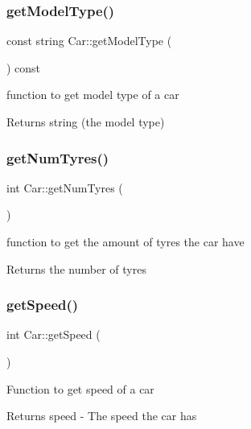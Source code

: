 \subsubsection{\texorpdfstring{get\+Model\+Type()}{getModelType()}}
{\footnotesize\ttfamily const string Car\+::get\+Model\+Type (\begin{DoxyParamCaption}{ }\end{DoxyParamCaption}) const\hspace{0.3cm}{\ttfamily [inline]}}

function to get model type of a car \begin{DoxyReturn}{Returns}
string (the model type) 
\end{DoxyReturn}
\mbox{\label{class_car_a37d6bc64d09b030dacd25de5f0fa0a64}} 
\subsubsection{\texorpdfstring{get\+Num\+Tyres()}{getNumTyres()}}
{\footnotesize\ttfamily int Car\+::get\+Num\+Tyres (\begin{DoxyParamCaption}{ }\end{DoxyParamCaption})}

function to get the amount of tyres the car have \begin{DoxyReturn}{Returns}
the number of tyres 
\end{DoxyReturn}
\mbox{\label{class_car_a18e48b5cf9815216b8e82351d36b8d9f}} 
\subsubsection{\texorpdfstring{get\+Speed()}{getSpeed()}}
{\footnotesize\ttfamily int Car\+::get\+Speed (\begin{DoxyParamCaption}{ }\end{DoxyParamCaption})\hspace{0.3cm}{\ttfamily [inline]}}

Function to get speed of a car \begin{DoxyReturn}{Returns}
speed -\/ The speed the car has 
\end{DoxyReturn}
\mbox{\label{class_car_a6b436cfadb57e26266ef2d2875619b77}} 
